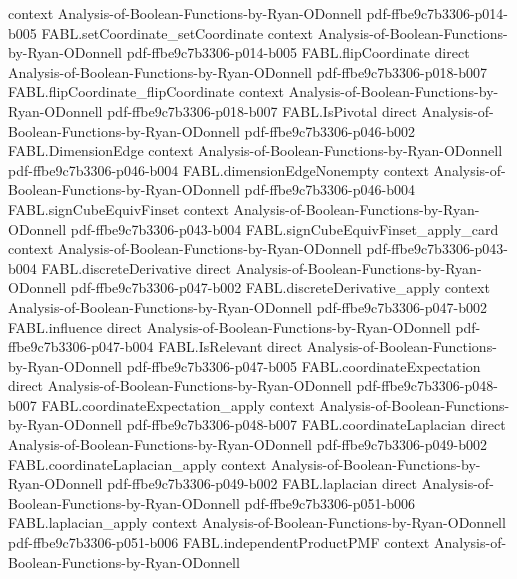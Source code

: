 \begin{theorem}
  {context}
  {Analysis-of-Boolean-Functions-by-Ryan-ODonnell}
  {pdf-ffbe9c7b3306-p014-b005}
\proofstep
  {FABL.setCoordinate_setCoordinate}
  {context}
  {Analysis-of-Boolean-Functions-by-Ryan-ODonnell}
  {pdf-ffbe9c7b3306-p014-b005}
\proofstep
  {FABL.flipCoordinate}
  {direct}
  {Analysis-of-Boolean-Functions-by-Ryan-ODonnell}
  {pdf-ffbe9c7b3306-p018-b007}
\proofstep
  {FABL.flipCoordinate_flipCoordinate}
  {context}
  {Analysis-of-Boolean-Functions-by-Ryan-ODonnell}
  {pdf-ffbe9c7b3306-p018-b007}
\proofstep
  {FABL.IsPivotal}
  {direct}
  {Analysis-of-Boolean-Functions-by-Ryan-ODonnell}
  {pdf-ffbe9c7b3306-p046-b002}
\proofstep
  {FABL.DimensionEdge}
  {context}
  {Analysis-of-Boolean-Functions-by-Ryan-ODonnell}
  {pdf-ffbe9c7b3306-p046-b004}
\proofstep
  {FABL.dimensionEdgeNonempty}
  {context}
  {Analysis-of-Boolean-Functions-by-Ryan-ODonnell}
  {pdf-ffbe9c7b3306-p046-b004}
\proofstep
  {FABL.signCubeEquivFinset}
  {context}
  {Analysis-of-Boolean-Functions-by-Ryan-ODonnell}
  {pdf-ffbe9c7b3306-p043-b004}
\proofstep
  {FABL.signCubeEquivFinset_apply_card}
  {context}
  {Analysis-of-Boolean-Functions-by-Ryan-ODonnell}
  {pdf-ffbe9c7b3306-p043-b004}
\proofstep
  {FABL.discreteDerivative}
  {direct}
  {Analysis-of-Boolean-Functions-by-Ryan-ODonnell}
  {pdf-ffbe9c7b3306-p047-b002}
\proofstep
  {FABL.discreteDerivative_apply}
  {context}
  {Analysis-of-Boolean-Functions-by-Ryan-ODonnell}
  {pdf-ffbe9c7b3306-p047-b002}
\proofstep
  {FABL.influence}
  {direct}
  {Analysis-of-Boolean-Functions-by-Ryan-ODonnell}
  {pdf-ffbe9c7b3306-p047-b004}
\proofstep
  {FABL.IsRelevant}
  {direct}
  {Analysis-of-Boolean-Functions-by-Ryan-ODonnell}
  {pdf-ffbe9c7b3306-p047-b005}
\proofstep
  {FABL.coordinateExpectation}
  {direct}
  {Analysis-of-Boolean-Functions-by-Ryan-ODonnell}
  {pdf-ffbe9c7b3306-p048-b007}
\proofstep
  {FABL.coordinateExpectation_apply}
  {context}
  {Analysis-of-Boolean-Functions-by-Ryan-ODonnell}
  {pdf-ffbe9c7b3306-p048-b007}
\proofstep
  {FABL.coordinateLaplacian}
  {direct}
  {Analysis-of-Boolean-Functions-by-Ryan-ODonnell}
  {pdf-ffbe9c7b3306-p049-b002}
\proofstep
  {FABL.coordinateLaplacian_apply}
  {context}
  {Analysis-of-Boolean-Functions-by-Ryan-ODonnell}
  {pdf-ffbe9c7b3306-p049-b002}
\proofstep
  {FABL.laplacian}
  {direct}
  {Analysis-of-Boolean-Functions-by-Ryan-ODonnell}
  {pdf-ffbe9c7b3306-p051-b006}
\proofstep
  {FABL.laplacian_apply}
  {context}
  {Analysis-of-Boolean-Functions-by-Ryan-ODonnell}
  {pdf-ffbe9c7b3306-p051-b006}
\proofstep
  {FABL.independentProductPMF}
  {context}
  {Analysis-of-Boolean-Functions-by-Ryan-ODonnell}

\end{theorem}
